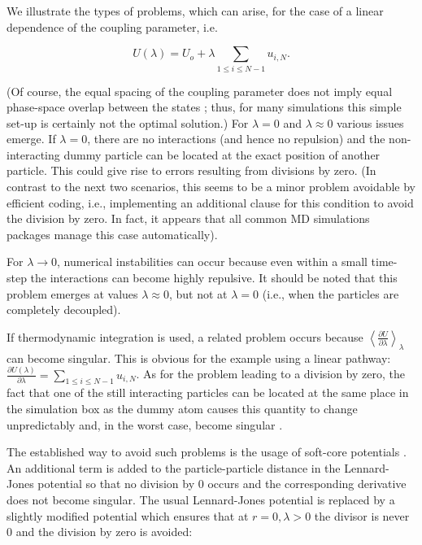 We illustrate the types of problems, which can arise, for the case
of a linear dependence of the coupling parameter,
i.e.

\[
U\left(\lambda\right)=U_{o}+\lambda\sum_{1\leq i\leq N-1}u_{i,N}.
\]


(Of course, the equal spacing of the coupling parameter does not imply
equal phase-space overlap between the states \cite{Shirts.2013};
thus, for many simulations this simple set-up is certainly not the
optimal solution.) For $\lambda=0$ and $\lambda\approx0$ various
issues emerge. If $\lambda=0$, there are no interactions (and hence
no repulsion) and the non-interacting dummy particle can be located
at the exact position of another particle. This could give rise to
errors resulting from divisions by zero. (In contrast to the next two scenarios,
this seems to be a minor problem avoidable by efficient coding, i.e.,
implementing an additional clause for this condition to avoid the division by zero. In fact, it appears that all common MD
simulations packages manage this case automatically\cite{Boresch.2011}).

For $\lambda\rightarrow0$, numerical instabilities can occur because
even within a small time-step the interactions can become highly repulsive.
It should be noted that this problem emerges at values $\lambda\approx0$,
but not at $\lambda=0$ (i.e., when the particles are completely decoupled).

If thermodynamic integration is used, a related problem occurs because
$\left\langle \frac{\partial U}{\partial\lambda}\right\rangle _{\lambda}$can
become singular. This is obvious for the example using a linear pathway:
$\frac{\partial U\left(\lambda\right)}{\partial\lambda}=\sum_{1\leq i\leq N-1}u_{i,N}$.
As for the problem leading to a division by zero, the fact that one of the
still interacting particles can be located at the same place
in the simulation box as the dummy atom causes this quantity to change
unpredictably and, in the worst case, become singular \cite{Boresch.2011}.

The established way to avoid such problems is the usage of soft-core potentials \cite{Steinbrecher.2011}.
An additional term is added to the particle-particle distance in the Lennard-Jones potential so that
no division by 0 occurs and the corresponding derivative does not
become singular. The usual Lennard-Jones potential is replaced by
a slightly modified potential which ensures that at $r=0,\lambda>\text{0}$
the divisor is never 0 and the division by zero is avoided:

